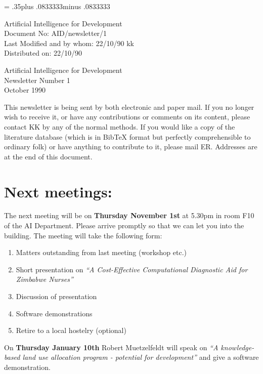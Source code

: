 \pagestyle{myheadings}
\setlength{\textheight}{9in}
\setlength{\topmargin}{0in}
\setlength{\headheight}{.3in}
\setlength{\headsep}{.5in}
\parindent=0pt
\parskip= .35\baselineskip plus .0833333\baselineskip minus .0833333\baselineskip

Artificial Intelligence for Development\\
Document No: AID/newsletter/1\\
Last Modified and by whom: 22/10/90 kk \\
Distributed on:  22/10/90\\
\LARGE
\begin{center} Artificial Intelligence for Development\\
Newsletter Number 1\\October 1990\\
\end{center}
\normalsize

This newsletter is being sent by both electronic and paper mail. If
you no longer wish to receive it, or have any contributions or
comments on its content, please contact KK by any of the normal
methods. If you would like a copy of the literature database (which is
in BibTeX format but perfectly comprehensible to ordinary folk) or
have anything to contribute to it, please mail ER. Addresses are at
the end of this document. 

\section{Next meetings:}
The next meeting will be on {\bf Thursday November 1st} at 5.30pm in
room F10 of the AI Department. Please arrive promptly so that we can
let you into the building. The meeting will take the following form: 
\begin{enumerate}
\item Matters outstanding from last meeting (workshop etc.)
\item Short presentation on {\em ``A Cost-Effective Computational Diagnostic
Aid for Zimbabwe Nurses''}
\item Discussion of presentation
\item Software demonstrations
\item Retire to a local hostelry (optional)
\end{enumerate}

On {\bf Thursday January 10th}
Robert Muetzelfeldt will speak on {\em ``A knowledge-based land use
allocation program - potential for development''} and give a software
demonstration. 

